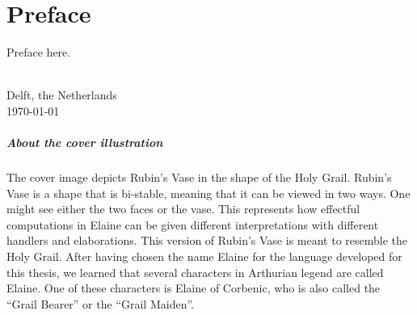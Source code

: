 \chapter{\label{chap:Preface}Preface}
Preface here.

\vspace{1cm}
\begin{flushright}
\theauthor{}\\
Delft, the Netherlands\\
\today{}\\
\end{flushright}

\vspace*{5em}
\paragraph{About the cover illustration} The cover image depicts Rubin's Vase in the shape of the Holy Grail. Rubin's Vase is a shape that is bi-stable, meaning that it can be viewed in two ways. One might see either the two faces or the vase. This represents how effectful computations in Elaine can be given different interpretations with different handlers and elaborations. This version of Rubin's Vase is meant to resemble the Holy Grail. After having chosen the name Elaine for the language developed for this thesis, we learned that several characters in Arthurian legend are called Elaine. One of these characters is Elaine of Corbenic, who is also called the ``Grail Bearer'' or the ``Grail Maiden''.
